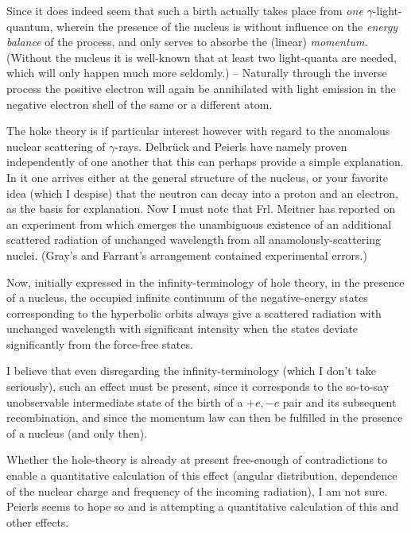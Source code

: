 \documentclass{article}
\begin{document}
Since it does indeed seem that such a birth actually takes place from \textit{one} $\gamma$-light-quantum, wherein the presence of the nucleus is without influence on the \textit{energy balance} of the process, and only serves to absorbe the (linear) \textit{momentum}. (Without the nucleus it is well-known that at least two light-quanta are needed, which will only happen much more seldomly.) -- Naturally through the inverse process the positive electron will again be annihilated with light emission in the negative electron shell of the same or a different atom.

The hoke theory is if particular interest however with regard to the anomalous nuclear scattering of $\gamma$-rays. Delbr\"uck and Peierls have namely proven independently of one another that this can perhaps provide a simple explanation. In it one arrives either at the general structure of the nucleus, or your favorite idea (which I despise) that the neutron can decay into a proton and an electron, as the basis for explanation. Now I must note that Frl. Meitner has reported on an experiment from which emerges the unambiguous existence of an additional scattered radiation of unchanged wavelength from all anamolously-scattering nuclei. (Gray's and Farrant's arrangement contained experimental errors.)

Now, initially expressed in the infinity-terminology of hole theory, in the presence of a nucleus, the occupied infinite continuum of the negative-energy states corresponding to the hyperbolic orbits always give a scattered radiation with unchanged wavelength with significant intensity when the states deviate significantly from the force-free states.

I believe that even disregarding the infinity-terminology (which I don't take seriously), such an effect must be present, since it corresponds to the so-to-say unobservable intermediate state of the birth of a $+e, -e$ pair and its subsequent recombination, and since the momentum law can then be fulfilled in the presence of a nucleus (and only then).

Whether the hole-theory is already at present free-enough of contradictions to enable a quantitative calculation of this effect (angular distribution, dependence of the nuclear charge and frequency of the incoming radiation), I am not sure. Peierls seems to hope so and is attempting a quantitative calculation of this and other effects.
\end{document}
